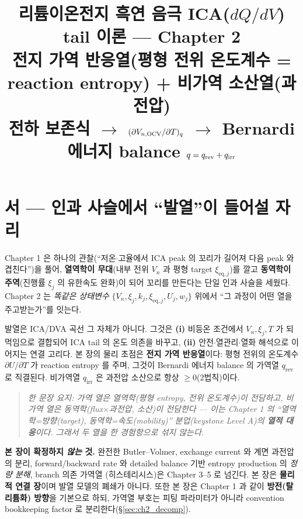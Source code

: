\documentclass[11pt,a4paper]{article}
\title{\textbf{리튬이온전지 흑연 음극 ICA($dQ/dV$) tail 이론 — Chapter 2}\\[0.4em]
\large 전지 가역 반응열(평형 전위 온도계수 = reaction entropy) + 비가역 소산열(과전압)\\[0.2em]
\normalsize 전하 보존식 $\to$ $(\partial V_{n,\mathrm{OCV}}/\partial T)_q$ $\to$ Bernardi 에너지 balance $q=q_\rev+q_\irr$}
\author{}
\date{}
\newcommand{\eq}{\mathrm{eq}}
\newcommand{\irr}{\mathrm{irr}}
\newcommand{\rev}{\mathrm{rev}}
\begin{document}
\maketitle

\section*{서 — 인과 사슬에서 ``발열''이 들어설 자리}
Chapter 1 은 하나의 관찰(``저온$\cdot$고율에서 ICA peak 의 꼬리가 길어져 다음 peak 와 겹친다'')을 풀어,
\textbf{열역학이 무대}(내부 전위 $V_n$ 과 평형 target $\xi_{\eq,j}$)를 깔고 \textbf{동역학이 주역}(진행률 $\xi_j$
의 유한속도 완화)이 되어 꼬리를 만든다는 단일 인과 사슬을 세웠다. Chapter 2 는 \emph{똑같은 상태변수}
$\{V_n,\xi_j,k_j,\xi_{\eq,j},U_j,w_j\}$ 위에서 ``그 과정이 어떤 열을 주고받는가''를 잇는다.

발열은 ICA/DVA 곡선 그 자체가 아니다. 그것은 \textbf{(i)} 비등온 조건에서 $V_n,\xi_j,T$ 가 되먹임으로 결합되어
ICA tail 의 온도 의존을 바꾸고, \textbf{(ii)} 안전$\cdot$열관리$\cdot$열화 해석으로 이어지는 연결 고리다. 본 장의
물리 초점은 \textbf{전지 가역 반응열}이다: 평형 전위의 온도계수 $\partial U/\partial T$ 가 reaction entropy 를
주며, 그것이 Bernardi 에너지 balance 의 가역열 $q_\rev$ 로 직결된다. 비가역열 $q_\irr$ 은 과전압 소산으로
항상 $\ge0$(2법칙)이다.

\begin{quote}\itshape
한 문장 요지: 가역 열은 열역학(평형 entropy, 전위 온도계수)이 전담하고, 비가역 열은 동역학(flux$\times$과전압,
소산)이 전담한다 — 이는 Chapter 1 의 ``열역학=방향(target), 동역학=속도(mobility)'' 분업(keystone Level A)의
\textbf{열적 대응}이다. 그래서 두 열을 한 경험항으로 섞지 않는다.
\end{quote}

\noindent\textbf{본 장이 확정하지 \emph{않는} 것.} 완전한 Butler--Volmer, exchange current 와 계면 과전압의
분리, forward/backward rate 와 detailed balance 기반 entropy production 의 \emph{정량 분해}, branch 의존 가역열
(히스테리시스)은 Chapter 3--5 로 넘긴다. 본 장은 \textbf{물리적 연결 장}이며 발열 모델의 폐쇄가 아니다. 또한 본
장은 Chapter 1 과 같이 \textbf{방전(탈리튬화) 방향}을 기본으로 하되, 가역열 부호는 피팅 파라미터가 아니라
convention bookkeeping factor 로 분리한다(\S\ref{sec:ch2_decomp}).
\end{document}
